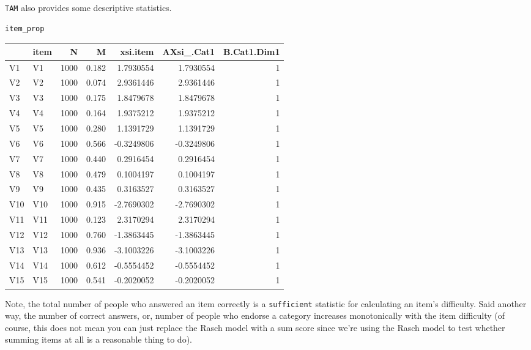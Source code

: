\documentclass[
]{book}
\newenvironment{Shaded}{\begin{snugshade}}{\end{snugshade}}
\newcommand{\NormalTok}[1]{#1}
\newcommand{\OtherTok}[1]{\textcolor[rgb]{0.56,0.35,0.01}{#1}}
\newcommand{\SpecialCharTok}[1]{\textcolor[rgb]{0.00,0.00,0.00}{#1}}
\begin{document}
\texttt{TAM} also provides some descriptive statistics.

\begin{Shaded}
\end{Shaded}

\begin{verbatim}
item_prop
\end{verbatim}

\begin{tabular}{l|l|r|r|r|r|r}
\hline
  & item & N & M & xsi.item & AXsi\_.Cat1 & B.Cat1.Dim1\\
\hline
V1 & V1 & 1000 & 0.182 & 1.7930554 & 1.7930554 & 1\\
\hline
V2 & V2 & 1000 & 0.074 & 2.9361446 & 2.9361446 & 1\\
\hline
V3 & V3 & 1000 & 0.175 & 1.8479678 & 1.8479678 & 1\\
\hline
V4 & V4 & 1000 & 0.164 & 1.9375212 & 1.9375212 & 1\\
\hline
V5 & V5 & 1000 & 0.280 & 1.1391729 & 1.1391729 & 1\\
\hline
V6 & V6 & 1000 & 0.566 & -0.3249806 & -0.3249806 & 1\\
\hline
V7 & V7 & 1000 & 0.440 & 0.2916454 & 0.2916454 & 1\\
\hline
V8 & V8 & 1000 & 0.479 & 0.1004197 & 0.1004197 & 1\\
\hline
V9 & V9 & 1000 & 0.435 & 0.3163527 & 0.3163527 & 1\\
\hline
V10 & V10 & 1000 & 0.915 & -2.7690302 & -2.7690302 & 1\\
\hline
V11 & V11 & 1000 & 0.123 & 2.3170294 & 2.3170294 & 1\\
\hline
V12 & V12 & 1000 & 0.760 & -1.3863445 & -1.3863445 & 1\\
\hline
V13 & V13 & 1000 & 0.936 & -3.1003226 & -3.1003226 & 1\\
\hline
V14 & V14 & 1000 & 0.612 & -0.5554452 & -0.5554452 & 1\\
\hline
V15 & V15 & 1000 & 0.541 & -0.2020052 & -0.2020052 & 1\\
\hline
\end{tabular}

Note, the total number of people who answered an item correctly is a \texttt{sufficient} statistic for calculating an item's difficulty. Said another way, the number of correct answers, or, number of people who endorse a category increases monotonically with the item difficulty (of course, this does not mean you can just replace the Rasch model with a sum score since we're using the Rasch model to test whether summing items at all is a reasonable thing to do).
\end{document}

